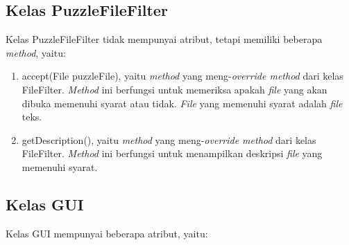 \subsection{Kelas PuzzleFileFilter}
\label{sec:kelaspuzzlefilefilter}

Kelas PuzzleFileFilter tidak mempunyai atribut, tetapi memiliki beberapa \textit{method}, yaitu:

\begin{enumerate}
\item accept(File puzzleFile), yaitu \textit{method} yang meng-\textit{override method} dari kelas FileFilter. \textit{Method} ini berfungsi untuk memeriksa apakah \textit{file} yang akan dibuka memenuhi syarat atau tidak. \textit{File} yang memenuhi syarat adalah \textit{file} teks.
\item getDescription(), yaitu \textit{method} yang meng-\textit{override method} dari kelas FileFilter. \textit{Method} ini berfungsi untuk menampilkan deskripsi \textit{file} yang memenuhi syarat.
\end{enumerate}

\subsection{Kelas GUI}
\label{sec:kelasgui}

Kelas GUI mempunyai beberapa atribut, yaitu:

